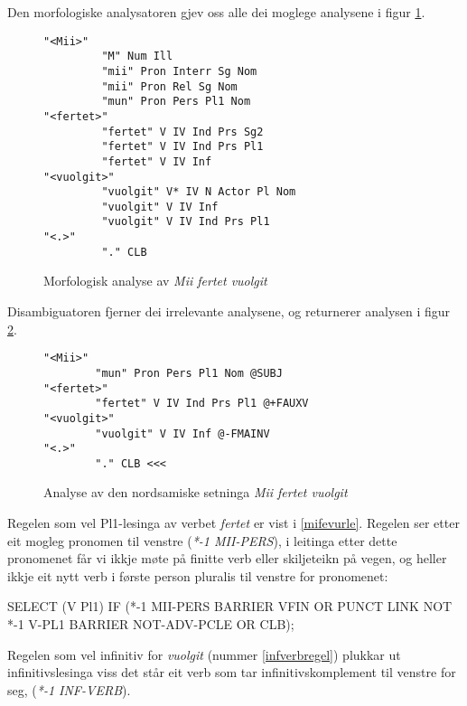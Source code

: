 \documentclass[a4paper,norsk]{article}
\begin{document}
Den morfologiske analysatoren gjev oss alle dei moglege analysene i figur \ref{mifevumulti}.%

\begin{figure}[htbp]
\begin{center}
\begin{verbatim}
"<Mii>"
         "M" Num Ill
         "mii" Pron Interr Sg Nom
         "mii" Pron Rel Sg Nom
         "mun" Pron Pers Pl1 Nom
"<fertet>"
         "fertet" V IV Ind Prs Sg2
         "fertet" V IV Ind Prs Pl1
         "fertet" V IV Inf
"<vuolgit>"
         "vuolgit" V* IV N Actor Pl Nom
         "vuolgit" V IV Inf
         "vuolgit" V IV Ind Prs Pl1
"<.>"
         "." CLB
\end{verbatim}
\caption{Morfologisk analyse av \emph{Mii fertet vuolgit}}
\label{mifevumulti}
\end{center}
\end{figure}

Disambiguatoren fjerner dei irrelevante analysene, og returnerer analysen i figur \ref{mifevu}. %

\begin{figure}[htbp]
\begin{center}
\begin{verbatim}
"<Mii>"
        "mun" Pron Pers Pl1 Nom @SUBJ
"<fertet>"
        "fertet" V IV Ind Prs Pl1 @+FAUXV
"<vuolgit>"
        "vuolgit" V IV Inf @-FMAINV
"<.>"
        "." CLB <<<
\end{verbatim}        
\caption{Analyse av den nordsamiske setninga \textit{Mii fertet vuolgit}}
\label{mifevu}
\end{center}
\end{figure}

Regelen som vel Pl1-lesinga av verbet \emph{fertet} er vist i \ref{mifevurle}. Regelen ser etter eit mogleg pronomen til venstre (\textit{*-1 MII-PERS}), i leitinga etter dette pronomenet får vi ikkje møte på finitte verb eller skiljeteikn på vegen, og heller ikkje eit nytt verb i første person pluralis til venstre for pronomenet:%

\begin{example}\label{mifevurle}
SELECT (V Pl1) IF (*-1 MII-PERS BARRIER VFIN OR PUNCT LINK NOT *-1 V-PL1 
	BARRIER NOT-ADV-PCLE OR CLB);
\end{example}	

Regelen som vel infinitiv for \emph{vuolgit} (nummer \ref{infverbregel}) plukkar ut infinitivslesinga viss det står eit verb som tar infinitivskomplement til venstre for seg, (\textit{*-1 INF-VERB}). %
\end{document}

